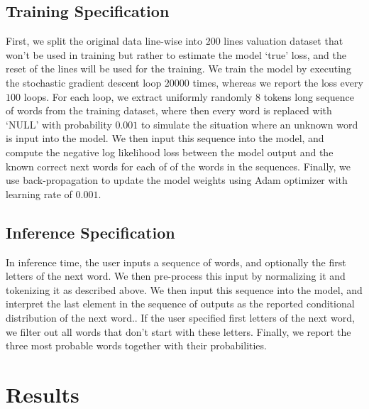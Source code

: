 \documentclass{article}
\theoremstyle{plain}
\theoremstyle{definition}
\theoremstyle{definition}
\theoremstyle{remark}
\begin{document}
\subsection{Training Specification}
First, we split the original data line-wise into \(200\) lines valuation dataset that won't be used in training but rather to estimate the model `true' loss, and the reset of the lines will be used for the training. We train the model by executing the stochastic gradient descent loop \(20000\) times, whereas we report the loss every \(100\) loops. For each loop, we extract uniformly randomly 8 tokens long sequence of words from the training dataset, where then every word is
replaced with `NULL' with probability \(0.001\) to simulate the situation where an unknown word is input into the model. We then input this sequence into the model, and compute the negative log likelihood loss between the model output and the known correct next words for each of of the words in the sequences. Finally, we use back-propagation to update the model weights using Adam optimizer with learning rate of \(0.001\).

\subsection{Inference Specification}
In inference time, the user inputs a sequence of words, and optionally the first letters of the next word. We then pre-process this input by normalizing it and tokenizing it as described above. We then input this sequence into the model, and interpret the last element in the sequence of outputs as the reported conditional distribution of the next word.. If the user specified first letters of the next word, we filter out all words that don't start with these letters. Finally, we report the three most probable words
together with their probabilities.

\section{Results}
\end{document}
